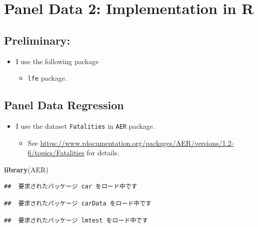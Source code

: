 \documentclass[]{book}
\newenvironment{Shaded}{\begin{snugshade}}{\end{snugshade}}
\newcommand{\KeywordTok}[1]{\textcolor[rgb]{0.13,0.29,0.53}{\textbf{#1}}}
\newcommand{\NormalTok}[1]{#1}
\providecommand{\tightlist}{%
  \setlength{\itemsep}{0pt}\setlength{\parskip}{0pt}}
\begin{document}
\chapter{Panel Data 2: Implementation in
R}\label{panel-data-2-implementation-in-r}

\section{Preliminary:}\label{preliminary}

\begin{itemize}
\tightlist
\item
  I use the following package

  \begin{itemize}
  \tightlist
  \item
    \texttt{lfe} package.
  \end{itemize}
\end{itemize}

\section{Panel Data Regression}\label{panel-data-regression}

\begin{itemize}
\tightlist
\item
  I use the dataset \texttt{Fatalities} in \texttt{AER} package.

  \begin{itemize}
  \tightlist
  \item
    See
    \url{https://www.rdocumentation.org/packages/AER/versions/1.2-6/topics/Fatalities}
    for details.
  \end{itemize}
\end{itemize}

\begin{Shaded}
\begin{Highlighting}[]
\KeywordTok{library}\NormalTok{(AER)}
\end{Highlighting}
\end{Shaded}

\begin{verbatim}
##  要求されたパッケージ car をロード中です
\end{verbatim}

\begin{verbatim}
##  要求されたパッケージ carData をロード中です
\end{verbatim}

\begin{verbatim}
##  要求されたパッケージ lmtest をロード中です
\end{verbatim}
\end{document}
